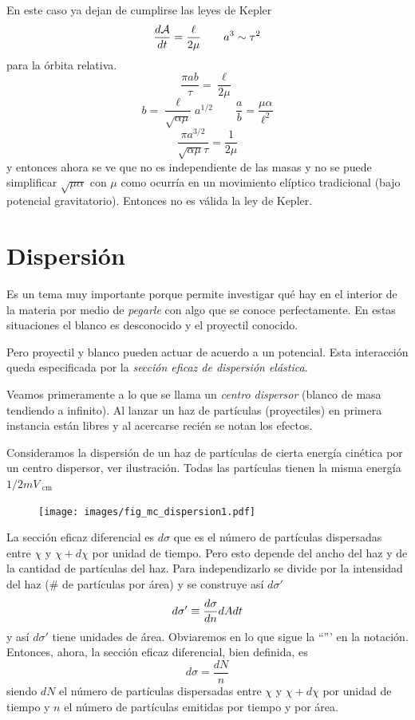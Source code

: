 \documentclass[10pt,oneside]{CBFT_book}
\begin{document}
En este caso ya dejan de cumplirse las leyes de Kepler
\[
	\frac{d^{\hspace{-0.05em}} {\mathcal{A}}}{d {t}^{\hspace{-0.05em}}} = \frac{\ell}{2\mu} \qquad a^3 \sim \tau^2 
\]
para la órbita relativa.
\[
	\frac{\pi a b }{\tau}= \frac{\ell}{2\mu} 
\]
\[
	b = \frac{\ell}{\sqrt{\alpha \mu}} a^{1/2} \qquad \frac{a}{b} = \frac{\mu \alpha}{\ell^2}
\]
\[
	\frac{\pi a^{3/2}}{\sqrt{\alpha \mu} \tau} = \frac{1}{2\mu}
\]
y entonces ahora se ve que no es independiente de las masas y no se puede simplificar $\sqrt{\mu\alpha}$ con
$\mu$ como ocurría en un movimiento elíptico tradicional (bajo potencial gravitatorio).
Entonces no es válida la ley de Kepler.

\section{Dispersión}

Es un tema muy importante porque permite investigar qué hay en el interior de la materia por medio
de {\it pegarle} con algo que se conoce perfectamente.
En estas situaciones el blanco es desconocido y el proyectil conocido.

Pero proyectil y blanco pueden actuar de acuerdo a un potencial. Esta interacción queda especificada
por la {\it sección eficaz de dispersión elástica}.

Veamos primeramente a lo que se llama un {\it centro dispersor} (blanco de masa tendiendo a infinito).
Al lanzar un haz de partículas (proyectiles) en primera instancia están libres y al acercarse recién se
notan los efectos.

Consideramos la dispersión de un haz de partículas de cierta energía cinética por un centro dispersor,
ver ilustración. Todas las partículas tienen la misma energía $1/2 m V_\text{ cm }$

\begin{figure}[htb]
	\begin{center}
	\texttt{[image: images/fig\_mc\_dispersion1.pdf]}	 
	\end{center}
	\caption{}
\end{figure} 


La sección eficaz diferencial es $d\sigma$ que es el número de partículas dispersadas entre 
$\chi$ y $\chi + d\chi$ por unidad de tiempo.
Pero esto depende del ancho del haz y de la cantidad de partículas del haz. Para independizarlo se
divide por la intensidad del haz (\# de partículas por área) y se construye así $d\sigma'$
\[
	d\sigma' \equiv \frac{d^{\hspace{-0.05em}} {\sigma}}{d {n}^{\hspace{-0.05em}}} dA dt 
\]
y así $d\sigma'$ tiene unidades de área. Obviaremos en lo que sigue la ``''' en la notación.
Entonces, ahora, la sección eficaz diferencial, bien definida, es 
\[
	d\sigma = \frac{dN}{n}
\]
siendo $dN$ el número de partículas dispersadas entre $\chi$ y $\chi + d\chi$ por unidad de tiempo
y $n$ el número de partículas emitidas por tiempo y por área.
\end{document}

